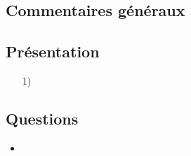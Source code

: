 \documentclass[a4paper, 11pt, final, garamond]{book}
\begin{document}
\setcounter{chapter}{0}

\chapter{}

\section{Commentaires généraux}

\section{Présentation}
\begin{enumerate}
	\item[1)]
\end{enumerate}

\section{Questions}
\begin{itemize}
	\item
\end{itemize}
\end{document}

